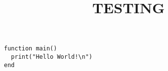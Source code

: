 \documentclass[10pt]{amsart}
\title{TESTING}
\begin{document}
\maketitle

% 
\begin{verbatim}
function main()
  print("Hello World!\n")
end
\end{verbatim}

\inputminted[frame=lines, linenos]{lua}{../paper/snippets/r1.lua}
\end{document}
